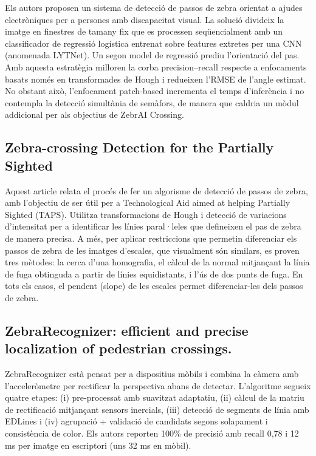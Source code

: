 \documentclass[10pt,a4paper,twocolumn,twoside]{article}
\begin{document}
Els autors proposen un sistema de detecció de passos de zebra orientat a ajudes electròniques per a persones amb discapacitat visual. La solució divideix la imatge en finestres de tamany fix que es processen seqüencialment amb un classificador de regressió logística entrenat sobre features extretes per una CNN (anomenada LYTNet). Un segon model de regressió prediu l’orientació del pas. Amb aquesta estratègia milloren la corba precision–recall respecte a enfocaments basats només en transformades de Hough i redueixen l’RMSE de l’angle estimat. No obstant això, l’enfocament patch-based incrementa el temps d’inferència i no contempla la detecció simultània de semàfors, de manera que caldria un mòdul addicional per als objectius de ZebrAI Crossing.

\subsection*{Zebra-crossing Detection for the Partially Sighted \cite{ZebraPartiallySighted}}
Aquest article relata el procés de fer un algorisme de detecció de passos de zebra, amb l'objectiu de ser útil per a Technological Aid aimed at helping Partially Sighted (TAPS). Utilitza transformacions de Hough i detecció de variacions d'intensitat per a identificar les línies paral·leles que defineixen el pas de zebra de manera precisa. A més, per aplicar restriccions que permetin diferenciar els passos de zebra de les imatges d'escales, que visualment són similars, es proven tres mètodes: la cerca d'una homografia, el càlcul de la normal mitjançant la línia de fuga obtinguda a partir de línies equidistants, i l'ús de dos punts de fuga. En tots els casos, el pendent (slope) de les escales permet diferenciar-les dels passos de zebra.

\subsection*{ZebraRecognizer: efficient and precise localization of pedestrian crossings. \cite{ZebraRecognizer}}

ZebraRecognizer està pensat per a dispositius mòbils i combina la càmera amb l’acceleròmetre per rectificar la perspectiva abans de detectar. L’algoritme segueix quatre etapes: (i) pre-processat amb suavitzat adaptatiu, (ii) càlcul de la matriu de rectificació mitjançant sensors inercials, (iii) detecció de segments de línia amb EDLines i (iv) agrupació + validació de candidats segons solapament i consistència de color. Els autors reporten 100\% de precisió amb recall 0,78 i 12 ms per imatge en escriptori (uns 32 ms en mòbil).
\end{document}
